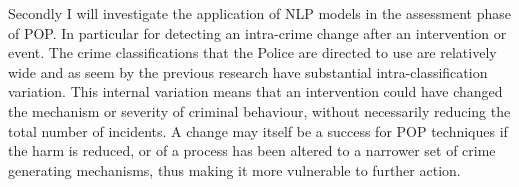 Secondly I will investigate the application of NLP models in the assessment phase of POP. In particular for detecting an intra-crime change after an intervention or event. The crime classifications that the Police are directed to use are relatively wide and as seem by the previous research \parencite{kuang2017crime, birks2020unsupervised} have substantial intra-classification variation. This internal variation means that an intervention could have changed the mechanism or severity of criminal behaviour, without necessarily reducing the total number of incidents. A change may itself be a success for POP techniques if the harm is reduced, or of a process has been altered to a narrower set of crime generating mechanisms, thus making it more vulnerable to further action.



